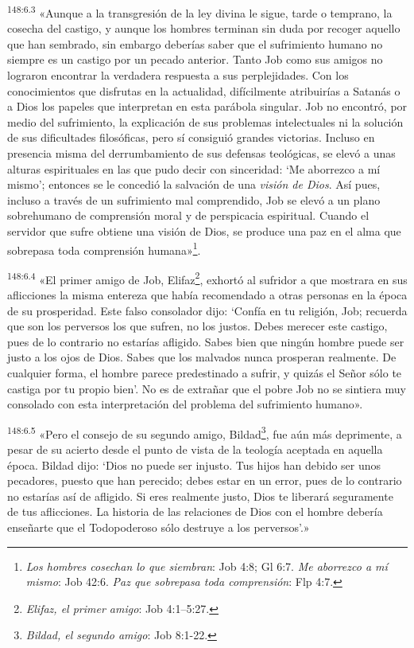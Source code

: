 \par 
\textsuperscript{148:6.3} «Aunque a la transgresión de la ley divina le sigue, tarde o temprano, la cosecha del castigo, y aunque los hombres terminan sin duda por recoger aquello que han sembrado, sin embargo deberías saber que el sufrimiento humano no siempre es un castigo por un pecado anterior. Tanto Job como sus amigos no lograron encontrar la verdadera respuesta a sus perplejidades. Con los conocimientos que disfrutas en la actualidad, difícilmente atribuirías a Satanás o a Dios los papeles que interpretan en esta parábola singular. Job no encontró, por medio del sufrimiento, la explicación de sus problemas intelectuales ni la solución de sus dificultades filosóficas, pero sí consiguió grandes victorias. Incluso en presencia misma del derrumbamiento de sus defensas teológicas, se elevó a unas alturas espirituales en las que pudo decir con sinceridad: `Me aborrezco a mí mismo'; entonces se le concedió la salvación de una \textit{visión de Dios}. Así pues, incluso a través de un sufrimiento mal comprendido, Job se elevó a un plano sobrehumano de comprensión moral y de perspicacia espiritual. Cuando el servidor que sufre obtiene una visión de Dios, se produce una paz en el alma que sobrepasa toda comprensión humana»\footnote{\textit{Los hombres cosechan lo que siembran}: Job 4:8; Gl 6:7. \textit{Me aborrezco a mí mismo}: Job 42:6. \textit{Paz que sobrepasa toda comprensión}: Flp 4:7.}.

\par 
\textsuperscript{148:6.4} «El primer amigo de Job, Elifaz\footnote{\textit{Elifaz, el primer amigo}: Job 4:1--5:27.}, exhortó al sufridor a que mostrara en sus aflicciones la misma entereza que había recomendado a otras personas en la época de su prosperidad. Este falso consolador dijo: `Confía en tu religión, Job; recuerda que son los perversos los que sufren, no los justos. Debes merecer este castigo, pues de lo contrario no estarías afligido. Sabes bien que ningún hombre puede ser justo a los ojos de Dios. Sabes que los malvados nunca prosperan realmente. De cualquier forma, el hombre parece predestinado a sufrir, y quizás el Señor sólo te castiga por tu propio bien'. No es de extrañar que el pobre Job no se sintiera muy consolado con esta interpretación del problema del sufrimiento humano».

\par 
\textsuperscript{148:6.5} «Pero el consejo de su segundo amigo, Bildad\footnote{\textit{Bildad, el segundo amigo}: Job 8:1-22.}, fue aún más deprimente, a pesar de su acierto desde el punto de vista de la teología aceptada en aquella época. Bildad dijo: `Dios no puede ser injusto. Tus hijos han debido ser unos pecadores, puesto que han perecido; debes estar en un error, pues de lo contrario no estarías así de afligido. Si eres realmente justo, Dios te liberará seguramente de tus aflicciones. La historia de las relaciones de Dios con el hombre debería enseñarte que el Todopoderoso sólo destruye a los perversos'.»

